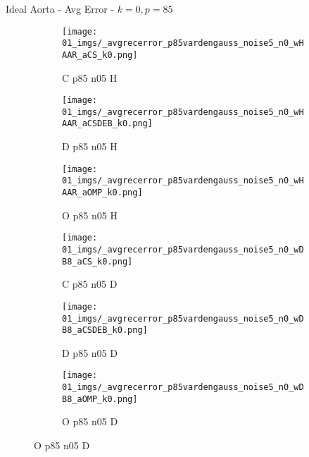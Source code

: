 \begin{frame}{Ideal Aorta - Avg Error - $k=0,p=85$}{}
\begin{figure}
\begin{subfigure}{0.13\textwidth}
\texttt{[image: 01\_imgs/\_avgrecerror\_p85vardengauss\_noise5\_n0\_wHAAR\_aCS\_k0.png]}
\caption*{\tiny C p85 n05 H}
\end{subfigure}
\begin{subfigure}{0.13\textwidth}
\texttt{[image: 01\_imgs/\_avgrecerror\_p85vardengauss\_noise5\_n0\_wHAAR\_aCSDEB\_k0.png]}
\caption*{\tiny D p85 n05 H}
\end{subfigure}
\begin{subfigure}{0.13\textwidth}
\texttt{[image: 01\_imgs/\_avgrecerror\_p85vardengauss\_noise5\_n0\_wHAAR\_aOMP\_k0.png]}
\caption*{\tiny O p85 n05 H}
\end{subfigure}
\begin{subfigure}{0.13\textwidth}
\texttt{[image: 01\_imgs/\_avgrecerror\_p85vardengauss\_noise5\_n0\_wDB8\_aCS\_k0.png]}
\caption*{\tiny C p85 n05 D}
\end{subfigure}
\begin{subfigure}{0.13\textwidth}
\texttt{[image: 01\_imgs/\_avgrecerror\_p85vardengauss\_noise5\_n0\_wDB8\_aCSDEB\_k0.png]}
\caption*{\tiny D p85 n05 D}
\end{subfigure}
\begin{subfigure}{0.13\textwidth}
\texttt{[image: 01\_imgs/\_avgrecerror\_p85vardengauss\_noise5\_n0\_wDB8\_aOMP\_k0.png]}
\caption*{\tiny O p85 n05 D}
\end{subfigure}

\vspace{5pt}


\end{figure}
\end{frame}
